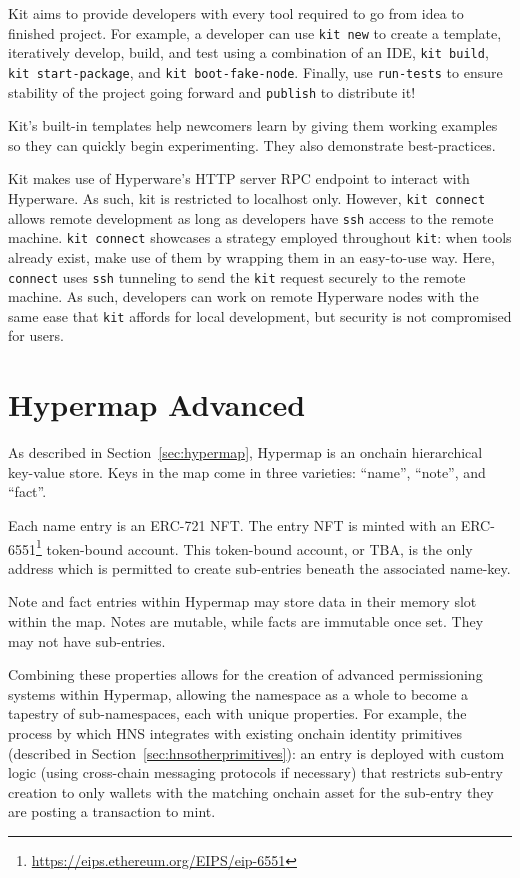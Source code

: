 \documentclass[runningheads]{llncs}
\begin{document}
Kit aims to provide developers with every tool required to go from idea to finished project.
For example, a developer can use \verb|kit new| to create a template, iteratively develop, build, and test using a combination of an IDE, \verb|kit build|, \verb|kit start-package|, and \verb|kit boot-fake-node|.
Finally, use \verb|run-tests| to ensure stability of the project going forward and \verb|publish| to distribute it!

Kit's built-in templates help newcomers learn by giving them working examples so they can quickly begin experimenting.
They also demonstrate best-practices.

Kit makes use of Hyperware's HTTP server RPC endpoint to interact with Hyperware.
As such, kit is restricted to localhost only.
However, \verb|kit connect| allows remote development as long as developers have \verb|ssh| access to the remote machine.
\verb|kit connect| showcases a strategy employed throughout \verb|kit|: when tools already exist, make use of them by wrapping them in an easy-to-use way.
Here, \verb|connect| uses \verb|ssh| tunneling to send the \verb|kit| request securely to the remote machine.
As such, developers can work on remote Hyperware nodes with the same ease that \verb|kit| affords for local development, but security is not compromised for users.

\section{Hypermap Advanced}
\label{sec:hypermapadvanced}

As described in Section~\ref{sec:hypermap}, Hypermap is an onchain hierarchical key-value store.
Keys in the map come in three varieties: ``name'', ``note'', and ``fact''.

Each name entry is an ERC-721 NFT.
The entry NFT is minted with an ERC-6551\footnote{\url{https://eips.ethereum.org/EIPS/eip-6551}} token-bound account.
This token-bound account, or TBA, is the only address which is permitted to create sub-entries beneath the associated name-key.

Note and fact entries within Hypermap may store data in their memory slot within the map.
Notes are mutable, while facts are immutable once set.
They may not have sub-entries.

Combining these properties allows for the creation of advanced permissioning systems within Hypermap, allowing the namespace as a whole to become a tapestry of sub-namespaces, each with unique properties.
For example, the process by which HNS integrates with existing onchain identity primitives (described in Section~\ref{sec:hnsotherprimitives}): an entry is deployed with custom logic (using cross-chain messaging protocols if necessary) that restricts sub-entry creation to only wallets with the matching onchain asset for the sub-entry they are posting a transaction to mint.
\end{document}
